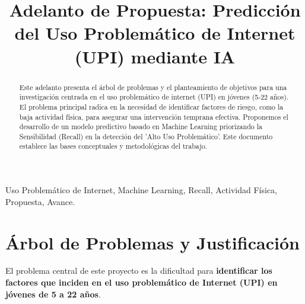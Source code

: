\documentclass[conference]{IEEEtran}
\begin{document}
	
	\title{Adelanto de Propuesta: Predicción del Uso Problemático de Internet (UPI) mediante IA}
	
	\author{
		\and
	}
	
	\maketitle
	
	\begin{abstract}
		Este adelanto presenta el árbol de problemas y el planteamiento de objetivos para una investigación centrada en el uso problemático de internet (UPI) en jóvenes (5-22 años). El problema principal radica en la necesidad de identificar factores de riesgo, como la baja actividad física, para asegurar una intervención temprana efectiva. Proponemos el desarrollo de un modelo predictivo basado en Machine Learning  priorizando la Sensibilidad (Recall) en la detección del 'Alto Uso Problemático'. Este documento establece las bases conceptuales y metodológicas del trabajo.
	\end{abstract}
	
	\begin{IEEEkeywords}
		Uso Problemático de Internet, Machine Learning, Recall, Actividad Física, Propuesta, Avance.
	\end{IEEEkeywords}
	
	\section{Árbol de Problemas y Justificación}
	\label{sec:arbol}
	
	El problema central de este proyecto es la dificultad para \textbf{identificar los factores que inciden en el uso problemático de Internet (UPI) en jóvenes de 5 a 22 años}. 
	
\end{document}
